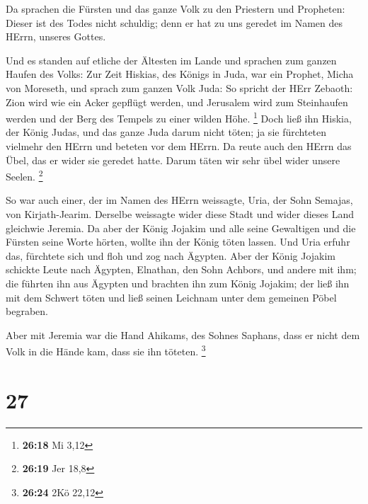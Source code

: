  Da sprachen die Fürsten und das ganze Volk zu den
Priestern und Propheten: Dieser ist des Todes nicht schuldig; denn er
hat zu uns geredet im Namen des HErrn, unseres Gottes.

 Und es standen auf etliche der Ältesten im Lande und
sprachen zum ganzen Haufen des Volks:  Zur Zeit Hiskias,
des Königs in Juda, war ein Prophet, Micha von Moreseth, und sprach zum
ganzen Volk Juda: So spricht der HErr Zebaoth: Zion wird wie ein Acker
gepflügt werden, und Jerusalem wird zum Steinhaufen werden und der Berg
des Tempels zu einer wilden Höhe. \footnote{\textbf{26:18} Mi 3,12}
 Doch ließ ihn Hiskia, der König Judas, und das ganze Juda
darum nicht töten; ja sie fürchteten vielmehr den HErrn und beteten vor
dem HErrn. Da reute auch den HErrn das Übel, das er wider sie geredet
hatte. Darum täten wir sehr übel wider unsere Seelen. \footnote{\textbf{26:19}
  Jer 18,8}

 So war auch einer, der im Namen des HErrn weissagte, Uria,
der Sohn Semajas, von Kirjath-Jearim. Derselbe weissagte wider diese
Stadt und wider dieses Land gleichwie Jeremia.  Da aber der
König Jojakim und alle seine Gewaltigen und die Fürsten seine Worte
hörten, wollte ihn der König töten lassen. Und Uria erfuhr das,
fürchtete sich und floh und zog nach Ägypten.  Aber der
König Jojakim schickte Leute nach Ägypten, Elnathan, den Sohn Achbors,
und andere mit ihm;  die führten ihn aus Ägypten und
brachten ihn zum König Jojakim; der ließ ihn mit dem Schwert töten und
ließ seinen Leichnam unter dem gemeinen Pöbel begraben.

 Aber mit Jeremia war die Hand Ahikams, des Sohnes Saphans,
dass er nicht dem Volk in die Hände kam, dass sie ihn töteten.
\footnote{\textbf{26:24} 2Kö 22,12}

\hypertarget{section-6}{%
\section{27}\label{section-6}}

